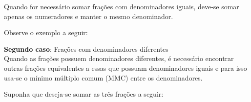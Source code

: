 	Quando for necessário somar frações com denominadores iguais, deve-se somar apenas os numeradores e manter o mesmo denominador.
	
	Observe o exemplo a seguir:
 
        \begin{texample}
        \centering
        \end{texample}     
	
	\hspace{-1.2cm} \textbf{Segundo caso}: Frações com denominadores diferentes\\
	Quando as frações possuem denominadores diferentes, é necessário encontrar outras frações equivalentes a essas que possuam denominadores iguais e para isso usa-se o mínimo múltiplo comum (MMC) entre os denominadores.
	
	Suponha que deseja-se somar as três frações a seguir:
 
	\begin{texample}
        \centering
        \end{texample}

